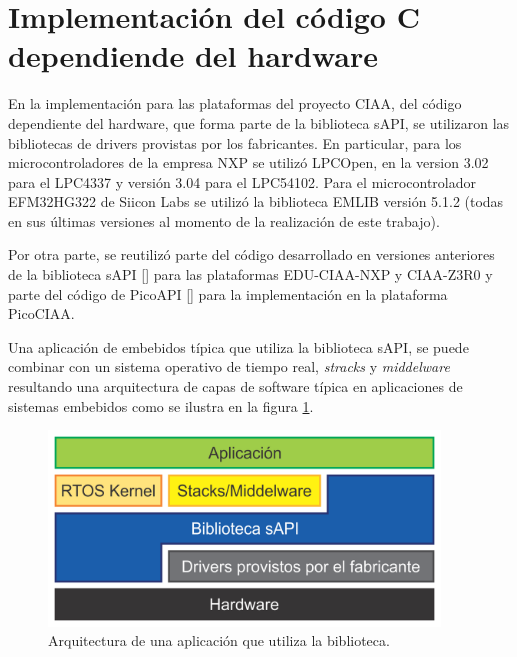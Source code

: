 \section{Implementación del código C dependiende del hardware}
\label{sec:codeImplementation}


En la implementación para las plataformas del proyecto CIAA, del código dependiente del hardware, que forma parte de la biblioteca sAPI, se utilizaron las bibliotecas de drivers provistas por los fabricantes. En particular, para los microcontroladores de la empresa NXP se utilizó LPCOpen, en la version 3.02 para el LPC4337 y versión 3.04 para el LPC54102. Para el microcontrolador EFM32HG322 de Siicon Labs se utilizó la biblioteca EMLIB versión 5.1.2 (todas en sus últimas versiones al momento de la realización de este trabajo).

Por otra parte, se reutilizó parte del código desarrollado en versiones anteriores de la biblioteca sAPI [] para las plataformas EDU-CIAA-NXP y CIAA-Z3R0 y parte del código de PicoAPI [] para la implementación en la plataforma PicoCIAA.

Una aplicación de embebidos típica que utiliza la biblioteca sAPI, se puede combinar con un sistema operativo de tiempo real, \emph{stracks} y \emph{middelware} resultando una arquitectura de capas de software típica en aplicaciones de sistemas embebidos como se ilustra en la figura \ref{fig:sapiCapas2}.

\begin{figure}[!htbp]
\begin{center}  %
\includegraphics*[width=10.4cm]{Figures/sapiCapas2.png}
\par\caption{Arquitectura de una aplicación que utiliza la biblioteca.}\label{fig:sapiCapas2}
\end{center}
\end{figure}
